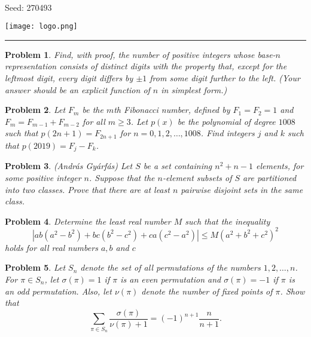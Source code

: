 \documentclass[12pt]{article}
\newtheorem{opg}{Problem}
\begin{document}
\parbox{0.6\textwidth}{ \\[2ex] {\Large Seed: 270493}}
\parbox{0.4\textwidth}{\texttt{[image: logo.png]}}

\hrule

\begin{opg}
Find, with proof, the number of positive integers whose base-$n$ representation consists of distinct digits with the property that, except for the leftmost digit, every digit differs by $\pm 1$ from some digit further to the left.  (Your answer should be an explicit function of $n$ in simplest form.)


\end{opg}
\begin{opg}
Let $F_m$ be the $m$th Fibonacci number, defined by $F_1 = F_2 = 1$ and $F_m = F_{m-1} + F_{m-2}$ for all $m \geq 3$.
Let $p(x)$ be the polynomial of degree $1008$ such that $p(2n+1) = F_{2n+1}$ for $n=0,1,2,\dots,1008$. Find integers $j$ and $k$ such that $p(2019) = F_j - F_k$.

\end{opg}
\begin{opg}
(András Gyárfás) Let $S$ be a set containing $n^2+n-1$ elements, for some positive integer $n$.  Suppose that the $n$-element subsets of $S$ are partitioned into two classes.  Prove that there are at least $n$ pairwise disjoint sets in the same class.


\end{opg}
\begin{opg}
Determine the least real number $M$ such that the inequality \[\left| ab\left(a^{2}-b^{2}\right)+bc\left(b^{2}-c^{2}\right)+ca\left(c^{2}-a^{2}\right)\right|\leq M\left(a^{2}+b^{2}+c^{2}\right)^{2}\] holds for all real numbers $a,b$ and $c$


\end{opg}
\begin{opg}
Let $S_n$ denote the set of all permutations of the numbers $1,2,\dots,n$.
For $\pi \in S_n$, let $\sigma(\pi) = 1$ if $\pi$ is an even permutation
and $\sigma(\pi) = -1$ if $\pi$ is an odd permutation.
Also, let $\nu(\pi)$ denote the number of fixed points of $\pi$.
Show that
\[
\sum_{\pi \in S_n} \frac{\sigma(\pi)}{\nu(\pi) + 1} = (-1)^{n+1}
\frac{n}{n+1}.
\]
\end{opg}
\end{document}
